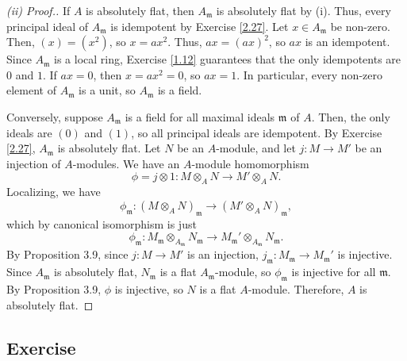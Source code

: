 \begin{proof}[(ii) Proof.]
If $A$ is absolutely flat, then $A_{\mathfrak{m}}$ is absolutely flat by (i). Thus, every principal ideal of $A_{\mathfrak{m}}$ is idempotent by Exercise \ref{2.27}. Let $x \in A_{\mathfrak{m}}$ be non-zero. Then,
$(x) = (x^2)$, so $x = ax^2$. Thus, $ax = (ax)^2$, so $ax$ is an idempotent. Since $A_{\mathfrak{m}}$ is a local ring, Exercise \ref{1.12} guarantees that the only idempotents are $0$ and $1$. If $ax = 0$, then
$x = ax^2 = 0$, so $ax = 1$. In particular, every non-zero element of $A_{\mathfrak{m}}$ is a unit, so $A_{\mathfrak{m}}$ is a field.

Conversely, suppose $A_{\mathfrak{m}}$ is a field for all maximal ideals $\mathfrak{m}$ of $A$. Then, the only ideals are $(0)$ and $(1)$, so all principal ideals are idempotent. By Exercise \ref{2.27}, 
$A_{\mathfrak{m}}$ is absolutely flat. Let $N$ be an $A$-module, and let $j : M \to M'$ be an injection of $A$-modules. We have an $A$-module homomorphism
$$\phi = j \otimes 1 : M \otimes_A N \to M' \otimes_A N.$$
Localizing, we have
$$\phi_{\mathfrak{m}} : (M \otimes_A N)_{\mathfrak{m}} \to (M' \otimes_A N)_{\mathfrak{m}},$$
which by canonical isomorphism is just
$$\phi_{\mathfrak{m}} : M_{\mathfrak{m}} \otimes_{A_{\mathfrak{m}}} N_{\mathfrak{m}} \to M_{\mathfrak{m}}' \otimes_{A_{\mathfrak{m}}} N_{\mathfrak{m}}.$$
By Proposition 3.9, since $j : M \to M'$ is an injection, $j_{\mathfrak{m}} : M_{\mathfrak{m}} \to M_{\mathfrak{m}}'$ is injective. Since $A_{\mathfrak{m}}$ is absolutely flat,
$N_{\mathfrak{m}}$ is a flat $A_{\mathfrak{m}}$-module, so $\phi_{\mathfrak{m}}$ is injective for all $\mathfrak{m}$. By Proposition 3.9, $\phi$ is injective, so $N$ is a flat $A$-module. Therefore,
$A$ is absolutely flat.
\end{proof}

\subsection{Exercise}\label{3.11}

